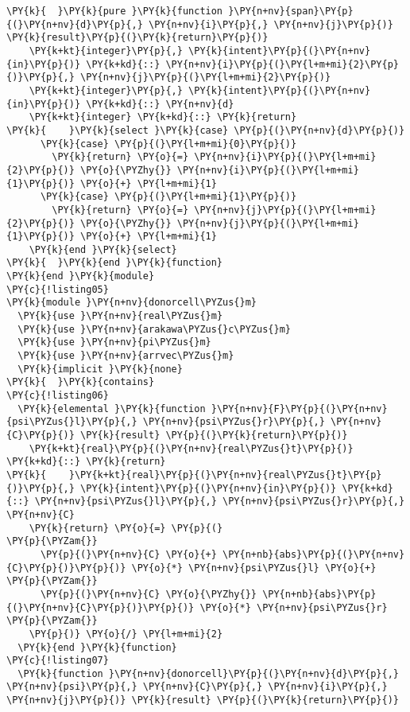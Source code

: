\begin{Verbatim}[commandchars=\\\{\}]
\PY{k}{  }\PY{k}{pure }\PY{k}{function }\PY{n+nv}{span}\PY{p}{(}\PY{n+nv}{d}\PY{p}{,} \PY{n+nv}{i}\PY{p}{,} \PY{n+nv}{j}\PY{p}{)} \PY{k}{result}\PY{p}{(}\PY{k}{return}\PY{p}{)}
    \PY{k+kt}{integer}\PY{p}{,} \PY{k}{intent}\PY{p}{(}\PY{n+nv}{in}\PY{p}{)} \PY{k+kd}{::} \PY{n+nv}{i}\PY{p}{(}\PY{l+m+mi}{2}\PY{p}{)}\PY{p}{,} \PY{n+nv}{j}\PY{p}{(}\PY{l+m+mi}{2}\PY{p}{)}
    \PY{k+kt}{integer}\PY{p}{,} \PY{k}{intent}\PY{p}{(}\PY{n+nv}{in}\PY{p}{)} \PY{k+kd}{::} \PY{n+nv}{d}
    \PY{k+kt}{integer} \PY{k+kd}{::} \PY{k}{return}
\PY{k}{    }\PY{k}{select }\PY{k}{case} \PY{p}{(}\PY{n+nv}{d}\PY{p}{)}
      \PY{k}{case} \PY{p}{(}\PY{l+m+mi}{0}\PY{p}{)}
        \PY{k}{return} \PY{o}{=} \PY{n+nv}{i}\PY{p}{(}\PY{l+m+mi}{2}\PY{p}{)} \PY{o}{\PYZhy{}} \PY{n+nv}{i}\PY{p}{(}\PY{l+m+mi}{1}\PY{p}{)} \PY{o}{+} \PY{l+m+mi}{1}
      \PY{k}{case} \PY{p}{(}\PY{l+m+mi}{1}\PY{p}{)}
        \PY{k}{return} \PY{o}{=} \PY{n+nv}{j}\PY{p}{(}\PY{l+m+mi}{2}\PY{p}{)} \PY{o}{\PYZhy{}} \PY{n+nv}{j}\PY{p}{(}\PY{l+m+mi}{1}\PY{p}{)} \PY{o}{+} \PY{l+m+mi}{1}
    \PY{k}{end }\PY{k}{select}
\PY{k}{  }\PY{k}{end }\PY{k}{function}
\PY{k}{end }\PY{k}{module}
\PY{c}{!listing05}
\PY{k}{module }\PY{n+nv}{donorcell\PYZus{}m}
  \PY{k}{use }\PY{n+nv}{real\PYZus{}m}
  \PY{k}{use }\PY{n+nv}{arakawa\PYZus{}c\PYZus{}m}
  \PY{k}{use }\PY{n+nv}{pi\PYZus{}m}
  \PY{k}{use }\PY{n+nv}{arrvec\PYZus{}m}
  \PY{k}{implicit }\PY{k}{none}
\PY{k}{  }\PY{k}{contains} 
\PY{c}{!listing06}
  \PY{k}{elemental }\PY{k}{function }\PY{n+nv}{F}\PY{p}{(}\PY{n+nv}{psi\PYZus{}l}\PY{p}{,} \PY{n+nv}{psi\PYZus{}r}\PY{p}{,} \PY{n+nv}{C}\PY{p}{)} \PY{k}{result} \PY{p}{(}\PY{k}{return}\PY{p}{)}
    \PY{k+kt}{real}\PY{p}{(}\PY{n+nv}{real\PYZus{}t}\PY{p}{)} \PY{k+kd}{::} \PY{k}{return}
\PY{k}{    }\PY{k+kt}{real}\PY{p}{(}\PY{n+nv}{real\PYZus{}t}\PY{p}{)}\PY{p}{,} \PY{k}{intent}\PY{p}{(}\PY{n+nv}{in}\PY{p}{)} \PY{k+kd}{::} \PY{n+nv}{psi\PYZus{}l}\PY{p}{,} \PY{n+nv}{psi\PYZus{}r}\PY{p}{,} \PY{n+nv}{C}
    \PY{k}{return} \PY{o}{=} \PY{p}{(}                                         \PY{p}{\PYZam{}}
      \PY{p}{(}\PY{n+nv}{C} \PY{o}{+} \PY{n+nb}{abs}\PY{p}{(}\PY{n+nv}{C}\PY{p}{)}\PY{p}{)} \PY{o}{*} \PY{n+nv}{psi\PYZus{}l} \PY{o}{+}                           \PY{p}{\PYZam{}}
      \PY{p}{(}\PY{n+nv}{C} \PY{o}{\PYZhy{}} \PY{n+nb}{abs}\PY{p}{(}\PY{n+nv}{C}\PY{p}{)}\PY{p}{)} \PY{o}{*} \PY{n+nv}{psi\PYZus{}r}                             \PY{p}{\PYZam{}}
    \PY{p}{)} \PY{o}{/} \PY{l+m+mi}{2}
  \PY{k}{end }\PY{k}{function}
\PY{c}{!listing07}
  \PY{k}{function }\PY{n+nv}{donorcell}\PY{p}{(}\PY{n+nv}{d}\PY{p}{,} \PY{n+nv}{psi}\PY{p}{,} \PY{n+nv}{C}\PY{p}{,} \PY{n+nv}{i}\PY{p}{,} \PY{n+nv}{j}\PY{p}{)} \PY{k}{result} \PY{p}{(}\PY{k}{return}\PY{p}{)}

\end{Verbatim}
